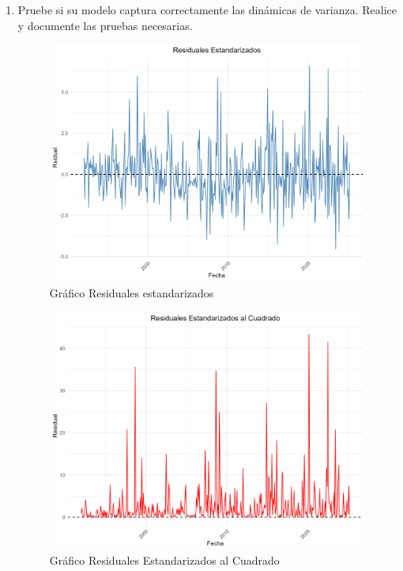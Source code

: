 \documentclass{article}
\theoremstyle{remark}
\theoremstyle{definition}
\begin{document}
\begin{enumerate}[label = \emph{\alph*})]
\begin{tcolorbox}[title=Soluci\'on 2.f]
            
        \end{tcolorbox}
    \item {Pruebe si su modelo captura correctamente las din\'amicas de varianza. Realice y documente las pruebas necesarias.}
        \begin{tcolorbox}[title=Soluci\'on 2.g]
            \begin{figure}[H]
                \centering
                \includegraphics[width=0.9\linewidth]{output/graf_resistd.png}
                \caption{Gr\'afico Residuales estandarizados}
                \label{fig:graf_residstd}
            \end{figure}

            \begin{figure}[H]
                \centering
                \includegraphics[width=0.9\linewidth]{output/graf_resistd2.png}
                \caption{Gr\'afico Residuales Estandarizados al Cuadrado}
                \label{fig:graf_residstd2}
            \end{figure}
            
        \end{tcolorbox}
\end{enumerate}
\end{document}
